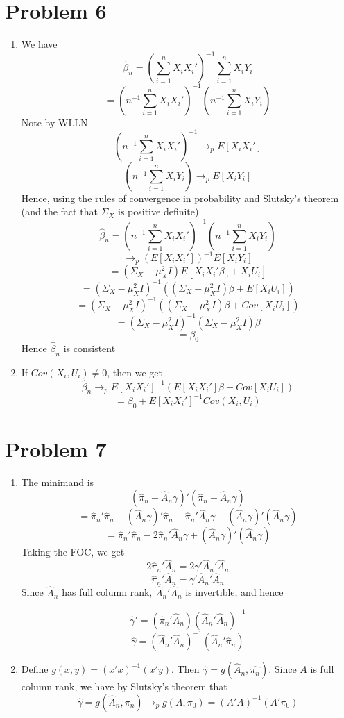 \documentclass[10pt,letter]{article}
\begin{document}
\section*{Problem 6}
\begin{enumerate}[label=(\alph*)]
\item We have
\[ \hat{\beta}_n = \left(\sum_{i=1}^n X_iX_i' \right)^{-1} \sum_{i=1}^n X_iY_i \]
\[ = \left(n^{-1}\sum_{i=1}^n X_iX_i' \right)^{-1} \left (n^{-1} \sum_{i=1}^n X_iY_i \right) \]
Note by WLLN
\[ \left(n^{-1}\sum_{i=1}^n X_iX_i' \right)^{-1} \to_p E[X_iX_i'] \]
\[ \left (n^{-1} \sum_{i=1}^n X_iY_i \right) \to_p E[X_i Y_i]\]
Hence, using the rules of convergence in probability and Slutsky's theorem (and the fact that $\Sigma_X$ is positive definite)
\[ \hat{\beta}_n = \left(n^{-1}\sum_{i=1}^n X_iX_i' \right)^{-1} \left (n^{-1} \sum_{i=1}^n X_iY_i \right) \]
\[ \to_p (E[X_iX_i'])^{-1} E[X_i Y_i] \]
\[ = (\Sigma_X - \mu_X^2 I) E[X_iX_i'\beta_0 + X_i U_i] \]
\[ = (\Sigma_X - \mu_X^2 I)^{-1} ((\Sigma_X - \mu_X^2 I) \beta + E[X_i U_i]) \]
\[ = (\Sigma_X - \mu_X^2 I)^{-1} ((\Sigma_X - \mu_X^2 I) \beta + Cov[X_i U_i]) \]
\[ = (\Sigma_X - \mu_X^2 I)^{-1} (\Sigma_X - \mu_X^2 I) \beta \]
\[ = \beta_0 \]
Hence $\hat{\beta}_n$ is consistent
\item If $Cov(X_i, U_i) \neq 0$, then we get
\[ \hat{\beta}_n \to_p E[X_iX_i']^{-1} (E[X_iX_i'] \beta + Cov[X_i U_i]) \]
\[ = \beta_0 + E[X_iX_i']^{-1} Cov(X_i, U_i) \]
\end{enumerate}
\section*{Problem 7}
\begin{enumerate}[label=(\alph*)]
\item The minimand is
\[ (\hat{\pi}_n - \hat{A}_n \gamma)'(\hat{\pi}_n - \hat{A}_n \gamma)  \]
\[ = \hat{\pi}_n'\hat{\pi}_n - (\hat{A}_n \gamma)'\hat{\pi}_n - \hat{\pi}_n'\hat{A}_n\gamma + (\hat{A}_n \gamma)'(\hat{A}_n \gamma) \]
\[ = \hat{\pi}_n'\hat{\pi}_n - 2\hat{\pi}_n'\hat{A}_n\gamma + (\hat{A}_n \gamma)'(\hat{A}_n \gamma) \]
Taking the FOC, we get
\[  2\hat{\pi}_n'\hat{A}_n = 2\gamma'\hat{A}_n'\hat{A}_n  \]
\[  \hat{\pi}_n'\hat{A}_n = \gamma'\hat{A}_n'\hat{A}_n  \]
Since $ \hat{A}_n$ has full column rank, $\hat{A}_n'\hat{A}_n$ is invertible, and hence

\[ \hat{\gamma}' = (\hat{\pi}_n'\hat{A}_n)(\hat{A}_n'\hat{A}_n)^{-1} \]
\[ \hat{\gamma} = (\hat{A}_n'\hat{A}_n)^{-1}(\hat{A}_n'\hat{\pi}_n) \]
\item Define $g(x, y) = (x'x)^{-1} (x'y)$. Then $\hat{\gamma} = g(\hat{A}_n, \hat{\pi_n})$. Since $A$ is full column rank, we have by Slutsky's theorem that
\[ \hat{\gamma} = g(\hat{A}_n, \hat{\pi_n}) \to_p g(A, \pi_0) = (A'A)^{-1} (A'\pi_0) \]
\end{enumerate}
\end{document}

